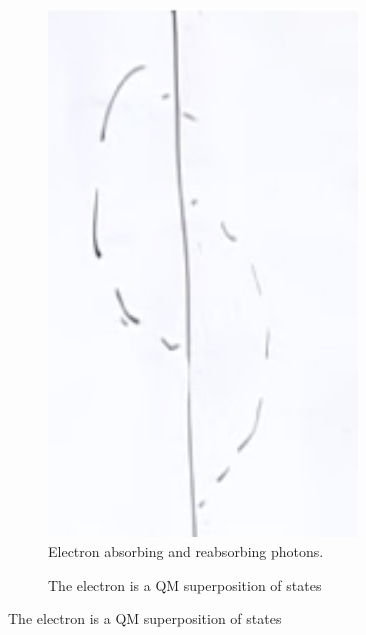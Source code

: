 \documentclass[]{article}
\begin{document}
\begin{figure}[H]
	\caption{Emission and absorption of photons}
	\begin{subfigure}{0.45\textwidth}
		\caption{Electron absorbing and reabsorbing photons.}
		\includegraphics[width=0.9\textwidth]{2-1-electron-photons0}
	\end{subfigure}
	\begin{subfigure}{0.45\textwidth}
		\caption{The electron is a QM superposition of states}\label{fig:2-1-electron-photons}

\end{subfigure}
\end{figure}
\end{document}
